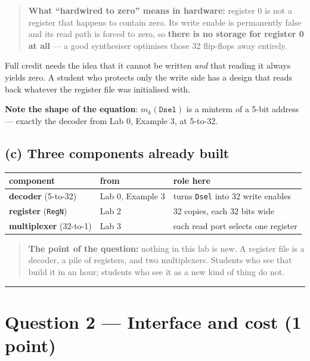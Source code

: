 \documentclass[11pt]{article}
\newcommand{\code}[1]{\texttt{#1}}
\newcommand{\hr}{\vspace{2pt}\hrule\vspace{6pt}}
\begin{document}
\begin{quote}
\textbf{What ``hardwired to zero'' means in hardware:} register 0 is not a
register that happens to contain zero. Its write enable is permanently false and
its read path is forced to zero, so \textbf{there is no storage for register 0 at
all} --- a good synthesiser optimises those 32 flip-flops away entirely.
\end{quote}

Full credit needs the idea that it cannot be written \emph{and} that reading it
always yields zero. A student who protects only the write side has a design that
reads back whatever the register file was initialised with.

\textbf{Note the shape of the equation}: $m_k(\code{Dsel})$ is a minterm of a
5-bit address --- exactly the decoder from Lab 0, Example 3, at 5-to-32.

\subsection*{(c) Three components already built}

\begin{center}
\begin{tabular}{lll}
\toprule
component & from & role here \\
\midrule
\textbf{decoder} (5-to-32) & Lab 0, Example 3 & turns \code{Dsel} into 32 write enables \\
\textbf{register} (\code{RegN}) & Lab 2 & 32 copies, each 32 bits wide \\
\textbf{multiplexer} (32-to-1) & Lab 3 & each read port selects one register \\
\bottomrule
\end{tabular}
\end{center}

\begin{quote}
\textbf{The point of the question:} nothing in this lab is new. A register file is
a decoder, a pile of registers, and two multiplexers. Students who see that build
it in an hour; students who see it as a new kind of thing do not.
\end{quote}

\vspace{4pt}\hr

\section*{Question 2 --- Interface and cost (1 point)}
\end{document}
